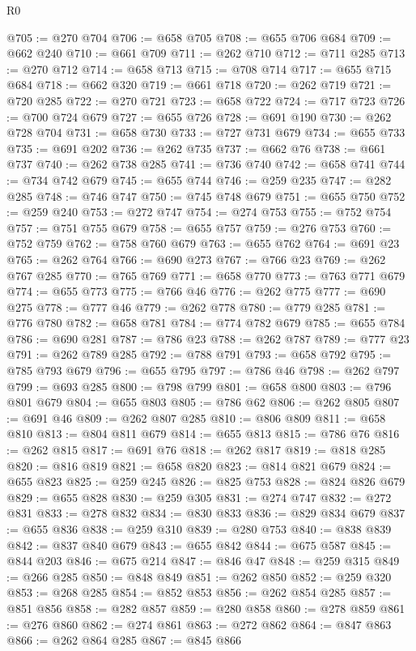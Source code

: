 \begin{lexlean}{R0}
\begin{coremodule}
@705 := @270 @704
@706 := @658 @705
@708 := @655 @706 @684
@709 := @662 @240
@710 := @661 @709
@711 := @262 @710
@712 := @711 @285
@713 := @270 @712
@714 := @658 @713
@715 := @708 @714
@717 := @655 @715 @684
@718 := @662 @320
@719 := @661 @718
@720 := @262 @719
@721 := @720 @285
@722 := @270 @721
@723 := @658 @722
@724 := @717 @723
@726 := @700 @724 @679
@727 := @655 @726
@728 := @691 @190
@730 := @262 @728 @704
@731 := @658 @730
@733 := @727 @731 @679
@734 := @655 @733
@735 := @691 @202
@736 := @262 @735
@737 := @662 @76
@738 := @661 @737
@740 := @262 @738 @285
@741 := @736 @740
@742 := @658 @741
@744 := @734 @742 @679
@745 := @655 @744
@746 := @259 @235
@747 := @282 @285
@748 := @746 @747
@750 := @745 @748 @679
@751 := @655 @750
@752 := @259 @240
@753 := @272 @747
@754 := @274 @753
@755 := @752 @754
@757 := @751 @755 @679
@758 := @655 @757
@759 := @276 @753
@760 := @752 @759
@762 := @758 @760 @679
@763 := @655 @762
@764 := @691 @23
@765 := @262 @764
@766 := @690 @273
@767 := @766 @23
@769 := @262 @767 @285
@770 := @765 @769
@771 := @658 @770
@773 := @763 @771 @679
@774 := @655 @773
@775 := @766 @46
@776 := @262 @775
@777 := @690 @275
@778 := @777 @46
@779 := @262 @778
@780 := @779 @285
@781 := @776 @780
@782 := @658 @781
@784 := @774 @782 @679
@785 := @655 @784
@786 := @690 @281
@787 := @786 @23
@788 := @262 @787
@789 := @777 @23
@791 := @262 @789 @285
@792 := @788 @791
@793 := @658 @792
@795 := @785 @793 @679
@796 := @655 @795
@797 := @786 @46
@798 := @262 @797
@799 := @693 @285
@800 := @798 @799
@801 := @658 @800
@803 := @796 @801 @679
@804 := @655 @803
@805 := @786 @62
@806 := @262 @805
@807 := @691 @46
@809 := @262 @807 @285
@810 := @806 @809
@811 := @658 @810
@813 := @804 @811 @679
@814 := @655 @813
@815 := @786 @76
@816 := @262 @815
@817 := @691 @76
@818 := @262 @817
@819 := @818 @285
@820 := @816 @819
@821 := @658 @820
@823 := @814 @821 @679
@824 := @655 @823
@825 := @259 @245
@826 := @825 @753
@828 := @824 @826 @679
@829 := @655 @828
@830 := @259 @305
@831 := @274 @747
@832 := @272 @831
@833 := @278 @832
@834 := @830 @833
@836 := @829 @834 @679
@837 := @655 @836
@838 := @259 @310
@839 := @280 @753
@840 := @838 @839
@842 := @837 @840 @679
@843 := @655 @842
@844 := @675 @587
@845 := @844 @203
@846 := @675 @214
@847 := @846 @47
@848 := @259 @315
@849 := @266 @285
@850 := @848 @849
@851 := @262 @850
@852 := @259 @320
@853 := @268 @285
@854 := @852 @853
@856 := @262 @854 @285
@857 := @851 @856
@858 := @282 @857
@859 := @280 @858
@860 := @278 @859
@861 := @276 @860
@862 := @274 @861
@863 := @272 @862
@864 := @847 @863
@866 := @262 @864 @285
@867 := @845 @866

\end{coremodule}
\end{lexlean}
